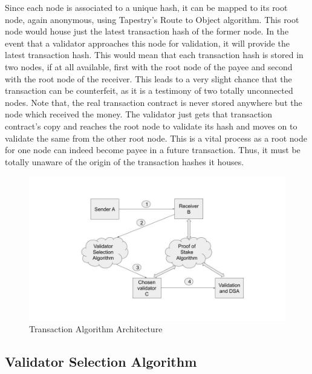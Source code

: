 \documentclass[conference,a4paper,12pt]{IEEEtran}
\begin{document}
	Since each node is associated to a unique hash, it can be mapped to its root node, again anonymous, using Tapestry's Route to Object algorithm. This root node would house just the latest transaction hash of the former node. In the event that a validator approaches this node for validation, it will provide the latest transaction hash. This would mean that each transaction hash is stored in two nodes, if at all available, first with the root node of the payee and second with the root node of the receiver. This leads to a very slight chance that the transaction can be counterfeit, as it is a testimony of two totally unconnected nodes. Note that, the real transaction contract is never stored anywhere but the node which received the money. The validator just gets that transaction contract's copy and reaches the root node to validate its hash and moves on to validate the same from the other root node. This is a vital process as a root node for one node can indeed become payee in a future transaction. Thus, it must be totally unaware of the origin of the transaction hashes it houses.

	\begin{figure}[h]
	  \includegraphics[width=\linewidth]{transaction_algo.jpg}
	  \caption{Transaction Algorithm Architecture}
	  \label{Transaction Architecture}
	\end{figure}

	\subsection{Validator Selection Algorithm}
\end{document}

